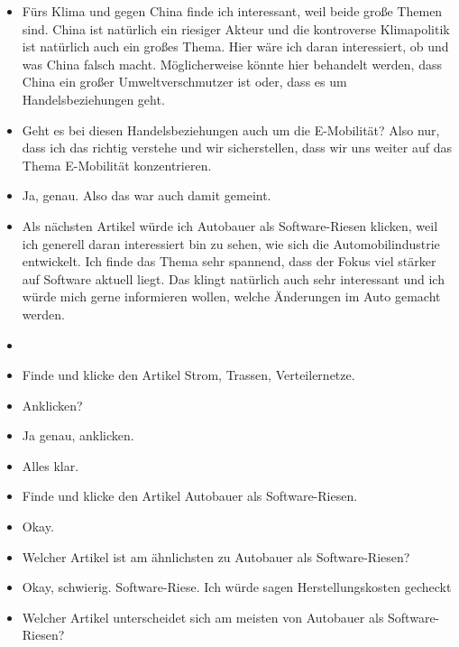 {\begin{itemize}[]
            \item {} \flqq Fürs Klima und gegen China\frqq{} finde ich interessant, weil beide große Themen sind.
                  China ist natürlich ein riesiger Akteur und die kontroverse Klimapolitik ist natürlich auch ein großes Thema.
                  Hier wäre ich daran interessiert, ob und was China falsch macht.
                  Möglicherweise könnte hier behandelt werden, dass China ein großer Umweltverschmutzer ist oder, dass es um Handelsbeziehungen geht.
            \item {} Geht es bei diesen Handelsbeziehungen auch um die E-Mobilität?
                  Also nur, dass ich das richtig verstehe und wir sicherstellen, dass wir uns weiter auf das Thema E-Mobilität konzentrieren.
            \item {} Ja, genau. Also das war auch damit gemeint.
            \item {} Als nächsten Artikel würde ich \flqq Autobauer als Software-Riesen\frqq{} klicken, weil ich generell daran interessiert bin zu sehen, wie sich die Automobilindustrie entwickelt.
                  Ich finde das Thema sehr spannend, dass der Fokus viel stärker auf Software aktuell liegt.
                  Das klingt natürlich auch sehr interessant und ich würde mich gerne informieren wollen, welche Änderungen im Auto gemacht werden.
            \item {}
            \item {} Finde und klicke den Artikel \flqq Strom, Trassen, Verteilernetze\frqq{}.
            \item {} Anklicken?
            \item {} Ja genau, anklicken.
            \item {} Alles klar.
            \item {} Finde und klicke den Artikel \flqq Autobauer als Software-Riesen\frqq{}.
            \item {} Okay.
            \item {} Welcher Artikel ist am ähnlichsten zu \flqq Autobauer als Software-Riesen\frqq{}?
            \item {} Okay, schwierig. Software-Riese. Ich würde sagen \flqq Herstellungskosten gecheckt\frqq{}
            \item {} Welcher Artikel unterscheidet sich am meisten von \flqq Autobauer als Software-Riesen\frqq{}?

\end{itemize}}
